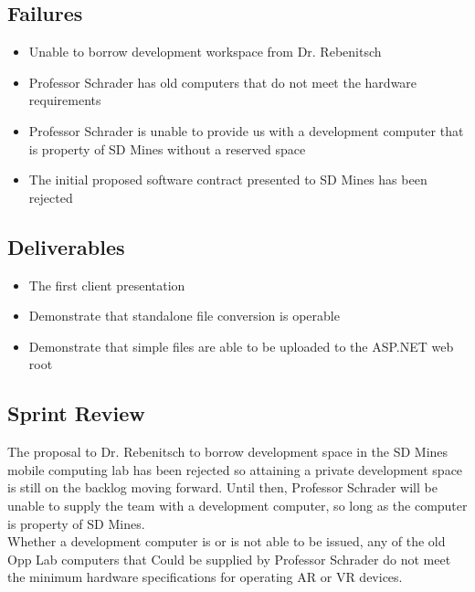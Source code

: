     \subsection{Failures}
    \label{sec:Sprint2_failures}
        \begin{itemize}
            \item Unable to borrow development workspace from Dr. Rebenitsch
            \item Professor Schrader has old computers that do not meet the hardware requirements
            \item Professor Schrader is unable to provide us with a development computer that is 
            property of SD Mines without a reserved space  
            \item The initial proposed software contract presented to SD Mines has been rejected
        \end{itemize}

    \subsection{Deliverables}
    \label{sec:Sprint2_deliverables}
    \begin{itemize}
        \item The first client presentation
        \item Demonstrate that standalone file conversion is operable
        \item Demonstrate that simple files are able to be uploaded to the ASP.NET web root
    \end{itemize}

    \subsection{Sprint Review}
    \label{sec:Sprint2_review}
        \hspace{7mm}
        The proposal to Dr. Rebenitsch to borrow development space in the SD Mines mobile computing lab has
        been rejected so attaining a private development space is still on the backlog moving forward.  Until
        then, Professor Schrader will be unable to supply the team with a development computer, so long as the
        computer is property of SD Mines.\\

        Whether a development computer is or is not able to be issued, any of the old Opp Lab computers that Could
        be supplied by Professor Schrader do not meet the minimum hardware specifications for operating AR or VR
        devices.\\

